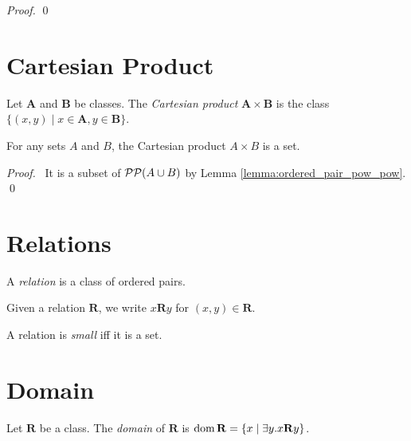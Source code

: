 \begin{proof}
    \pf
    \qed
\end{proof}

\section{Cartesian Product}

\begin{definition}
    Let $\mathbf{A}$ and $\mathbf{B}$ be classes. The \emph{Cartesian product} 
    $\mathbf{A} \times \mathbf{B}$ is the class
    $\{ (x,y) \mid x \in \mathbf{A}, y \in \mathbf{B} \}$.
\end{definition}

\begin{theorem}
    For any sets $A$ and $B$, the Cartesian product $A \times B$ is a set.
\end{theorem}

\begin{proof}
    \pf\ It is a subset of $\mathcal{P} \mathcal{P} (A \cup B)$ by Lemma \ref{lemma:ordered_pair_pow_pow}. \qed
\end{proof}

\section{Relations}

\begin{definition}
    A \emph{relation} is a class of ordered pairs.

    Given a relation $\mathbf{R}$, we write $x\mathbf{R}y$ for $(x,y) \in \mathbf{R}$.

    A relation is \emph{small} iff it is a set.
\end{definition}

\section{Domain}

\begin{definition}
    Let $\mathbf{R}$ be a class. The \emph{domain} of $\mathbf{R}$ is 
    $\operatorname{dom} \mathbf{R} = \{ x \mid \exists y. x\mathbf{R}y \}$.
\end{definition}

